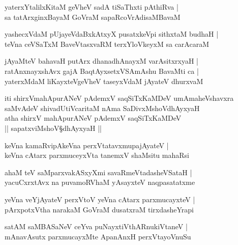 \begin{shloka}
yaterxYtalilxKitaM geVheV sadA tiSaThxti pAthiRva |\\
sa tatArxginxBayaM GoVraM sapaRcoVrAdisaMBavaM
\end{shloka}

\begin{shloka}
yashecxVdaM pUjayeVdaBxkAtxyX pusatxkeVpi sithxtaM budhaH |\\
teVna ceVSaTxM BaveVtasxvaRM terxYloVkeyxM sa carAcaraM
\end{shloka}

\begin{shloka}
jAyaMteV bahavaH putArx dhanadhAnayxM varAsitxrxyaH |\\
ratAnxnayxshAvx gajA BaqtAyxsetxVSAmAshu BavaMti ca |\\
yaterxMdaM liKayxteVgeVheV taseyxVdaM jAyateV dhurxvaM 
\end{shloka}

\setcounter{shloka}{0}
\begin{center}
iti shirxVmahApurANeV pAdemxV saqSiTxKaMDeV umAmaheVshavxra\\ 
saMvAdeV shivadUtiVcaritaM nAma SaDivxMshoVdhAyxyaH\\
\large{atha shirxV mahApurANeV pAdemxV saqSiTxKaMDeV}\\
|| sapatxviMshoV\S dhAyxyaH ||
\end{center}

\begin{shloka}
keVna kamaRvipAkeVna perxVtatavxmupajAyateV |\\
keVna cAtarx parxmuceyxVta tanemxV shaMsitu mahaRsi
\end{shloka}

\begin{shloka}
ahaM teV saMparxvakASxyXmi savaRmeVtadasheVSataH |\\
yacuCxrxtAvx na puvamoRVhaM yAsayxteV naqpasatatxme
\end{shloka}

\begin{shloka}
yeVna veYjAyateV perxVtoV yeVna cAtarx parxmucayxteV |\\
pArxpotxVtha narakaM GoVraM dusatxraM tirxdasheYrapi
\end{shloka}

\begin{shloka}
satAM saMBASaNeV ceYva puNayxtiVthARnukiVtaneV |\\
mAnavAsutx parxmucayxMte ApanAnxH perxVtayoVnuSu
\end{shloka}

